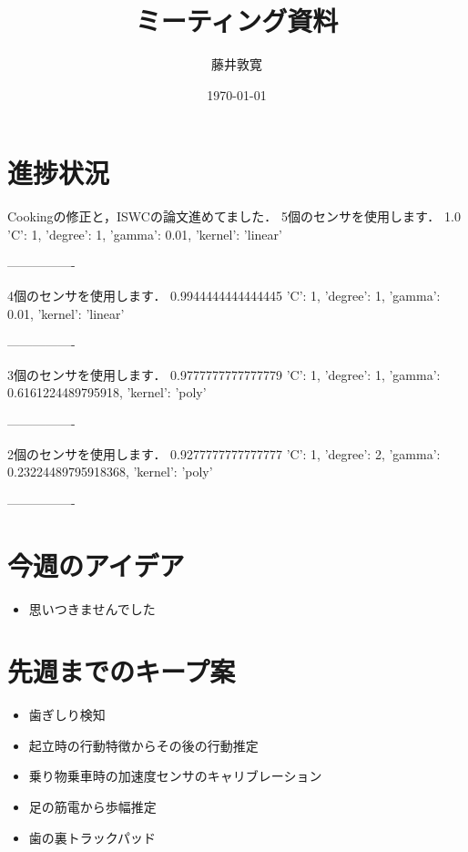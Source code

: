 \documentclass[a4j,twocolumn,10pt]{jarticle}
\title{ミーティング資料}
\author{藤井敦寛}
\date{\today}
\begin{document}
\maketitle

\section{進捗状況}
Cookingの修正と，ISWCの論文進めてました．
5個のセンサを使用します．
1.0
{'C': 1, 'degree': 1, 'gamma': 0.01, 'kernel': 'linear'}

----------------


4個のセンサを使用します．
0.9944444444444445
{'C': 1, 'degree': 1, 'gamma': 0.01, 'kernel': 'linear'}

----------------


3個のセンサを使用します．
0.9777777777777779
{'C': 1, 'degree': 1, 'gamma': 0.6161224489795918, 'kernel': 'poly'}

----------------


2個のセンサを使用します．
0.9277777777777777
{'C': 1, 'degree': 2, 'gamma': 0.23224489795918368, 'kernel': 'poly'}

----------------

\section{今週のアイデア}
\begin{itemize}
  \item 思いつきませんでした
\end{itemize}

\section{先週までのキープ案}
\begin{itemize}
  \item 歯ぎしり検知
  \item 起立時の行動特徴からその後の行動推定
  \item 乗り物乗車時の加速度センサのキャリブレーション
  \item 足の筋電から歩幅推定
  \item 歯の裏トラックパッド
\end{itemize}
\end{document}

